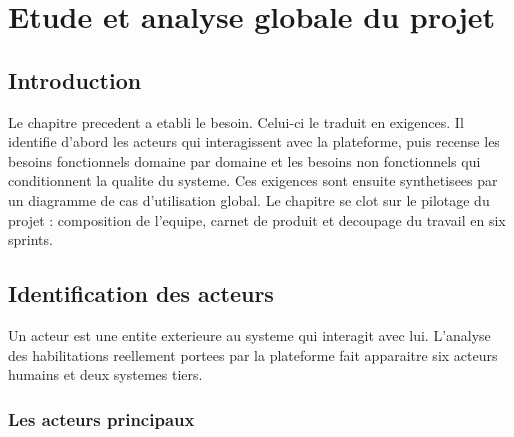 \chapter{Etude et analyse globale du projet}
\label{chap:analyse}

\section*{Introduction}

Le chapitre precedent a etabli le besoin. Celui-ci le traduit en
exigences. Il identifie d'abord les acteurs qui interagissent avec la
plateforme, puis recense les besoins fonctionnels domaine par domaine et
les besoins non fonctionnels qui conditionnent la qualite du systeme. Ces
exigences sont ensuite synthetisees par un diagramme de cas d'utilisation
global. Le chapitre se clot sur le pilotage du projet : composition de
l'equipe, carnet de produit et decoupage du travail en six sprints.

\section{Identification des acteurs}
\label{sec:acteurs}

Un acteur est une entite exterieure au systeme qui interagit avec lui.
L'analyse des habilitations reellement portees par la plateforme fait
apparaitre six acteurs humains et deux systemes tiers.

\subsection{Les acteurs principaux}

